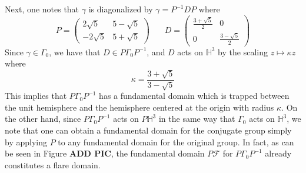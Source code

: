 \documentclass[]{article}
\begin{document}
Next, one notes that $\gamma$ is diagonalized by $\gamma = P^{-1}DP$ where
$$
P =
\begin{pmatrix}
	2\sqrt{5} & 5 - \sqrt{5} \\
	-2\sqrt{5} & 5 + \sqrt{5}
\end{pmatrix} ~~~~~~~~
D =
\begin{pmatrix}
	\frac{3 + \sqrt{5}}{2} & 0 \\
	0 & \frac{3 - \sqrt{5}}{2}
\end{pmatrix}
$$
Since $\gamma \in \Gamma_0$, we have that $D \in P\Gamma_0P^{-1}$, and $D$ acts on $\mathbb{H}^3$ by the scaling $z \mapsto \kappa z$ where
$$
\kappa = \frac{3 + \sqrt{5}}{3 - \sqrt{5}}
$$
This implies that $P\Gamma_0P^{-1}$ has a fundamental domain which is trapped between the unit hemisphere and the hemisphere centered at the origin with radius $\kappa$.
On the other hand, since $P\Gamma_0P^{-1}$ acts on $P\mathbb{H}^3$ in the same way that $\Gamma_0$ acts on $\mathbb{H}^3$, we note that one can obtain a fundamental domain for the conjugate group simply by applying $P$ to any fundamental domain for the original group.
In fact, as can be seen in Figure \textbf{ADD PIC}, the fundamental domain $P\mathcal{F}$ for $P\Gamma_0P^{-1}$ already constitutes a flare domain.

\pagebreak

\printbibliography
\end{document}

